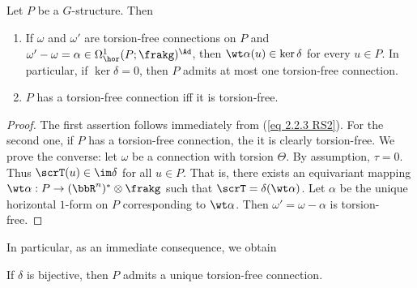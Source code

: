 \begin{prop}[{{\cite[Prop.~2.2.6]{RS2}}}]\label{prop 2.2.6 RS2}
    Let $P$ be a $G$-structure. Then
    \begin{enumerate}
        \item If $\omega$ and $\omega'$ are torsion-free connections on $P$ and $\omega'-\omega=\alpha\in\Omega^1_{\hor}(P;\frakg)^\Ad$, then $\wt\alpha(u)\in\ker\delta$ for every $u\in P$. In particular, if $\ker\delta=0$, then $P$ admits at most one torsion-free connection.
        \item $P$ has a torsion-free connection iff it is torsion-free.
    \end{enumerate}
\end{prop}
\begin{proof}
    The first assertion follows immediately from (\ref{eq 2.2.3 RS2}). For the second one, if $P$ has a torsion-free connection, the it is clearly torsion-free. We prove the converse: let $\omega$ be a connection with torsion $\Theta$. By assumption, $\tau=0$. Thus $\scrT(u)\in\im\delta$ for all $u\in P$. That is, there exists an equivariant mapping $\wt\alpha:P\to (\bbR^n)^\ast\otimes\frakg$ such that $\scrT=\delta(\wt\alpha)$. Let $\alpha$ be the unique horizontal $1$-form on $P$ corresponding to $\wt\alpha$. Then $\omega'=\omega-\alpha$ is torsion-free.
\end{proof}

In particular, as an immediate consequence, we obtain 
\begin{cor}[{{\cite[Cor.~2.2.7]{RS2}}}]\label{cor 2.2.7 RS2}
    If $\delta$ is bijective, then $P$ admits a unique torsion-free connection.
\end{cor}

